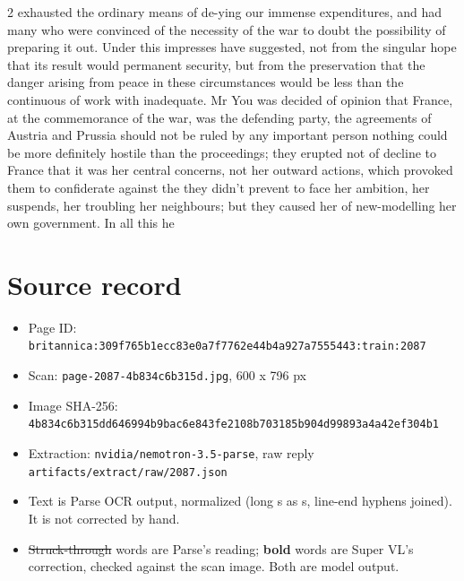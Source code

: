 \documentclass[10pt]{article}
\begin{document}
\begin{multicols}{2}
exhausted the ordinary means of de-ying our immense expenditures, and had many who were convinced of the necessity of the war to doubt the possibility of preparing it out. Under this impresses have suggested, not from the singular hope that its result would permanent security, but from the preservation that the danger arising from peace in these circumstances would be less than the continuous of work with inadequate. Mr You was decided of opinion that France, at the commemorance of the war, was the defending party, the agreements of Austria and Prussia should not be ruled by any important person nothing could be more definitely hostile than the proceedings; they erupted not of decline to France that it was her central concerns, not her outward actions, which provoked them to confiderate against the they didn't prevent to face her ambition, her suspends, her troubling her neighbours; but they caused her of new-modelling her own government. In all this he
\end{multicols}
\section*{Source record}
\begin{itemize}
\item Page ID: \texttt{britannica:309f765b1ecc83e0a7f7762e44b4a927a7555443:train:2087}
\item Scan: \texttt{page-2087-4b834c6b315d.jpg}, 600 x 796 px
\item Image SHA-256: \texttt{\small 4b834c6b315dd646994b9bac6e843fe2108b703185b904d99893a4a42ef304b1}
\item Extraction: \texttt{nvidia/nemotron-3.5-parse}, raw reply \texttt{artifacts/extract/raw/2087.json}
\item Text is Parse OCR output, normalized (long s as s, line-end hyphens joined). It is not corrected by hand.
\item \sout{Struck-through} words are Parse's reading; \textbf{bold} words are Super VL's correction, checked against the scan image. Both are model output.
\end{itemize}
\end{document}
